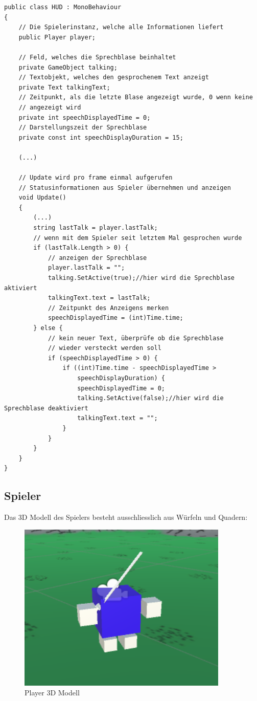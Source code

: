 \begin{lstlisting}[caption={Sprechblase ein- und ausblenden}]
public class HUD : MonoBehaviour
{
	// Die Spielerinstanz, welche alle Informationen liefert
	public Player player;

	// Feld, welches die Sprechblase beinhaltet
	private GameObject talking;
	// Textobjekt, welches den gesprochenem Text anzeigt
	private Text talkingText;
	// Zeitpunkt, als die letzte Blase angezeigt wurde, 0 wenn keine 
	// angezeigt wird
	private int speechDisplayedTime = 0;
	// Darstellungszeit der Sprechblase
	private const int speechDisplayDuration = 15;

	(...)
	
	// Update wird pro frame einmal aufgerufen
	// Statusinformationen aus Spieler übernehmen und anzeigen
	void Update()
	{
		(...)
		string lastTalk = player.lastTalk;
		// wenn mit dem Spieler seit letztem Mal gesprochen wurde
		if (lastTalk.Length > 0) {
			// anzeigen der Sprechblase
			player.lastTalk = "";
			talking.SetActive(true);//hier wird die Sprechblase aktiviert
			talkingText.text = lastTalk;
			// Zeitpunkt des Anzeigens merken
			speechDisplayedTime = (int)Time.time;
		} else {
			// kein neuer Text, überprüfe ob die Sprechblase 
			// wieder versteckt werden soll
			if (speechDisplayedTime > 0) {
				if ((int)Time.time - speechDisplayedTime > 
					speechDisplayDuration) {
					speechDisplayedTime = 0;
					talking.SetActive(false);//hier wird die Sprechblase deaktiviert
					talkingText.text = "";
				}
			}
		}	
	}
}
\end{lstlisting}

\subsection{Spieler}

Das 3D Modell des Spielers besteht ausschliesslich aus Würfeln und Quadern:

\begin{figure}[H]
\includegraphics[scale=1]{screenshots/player.png}
\caption{Player 3D Modell}
\end{figure}

